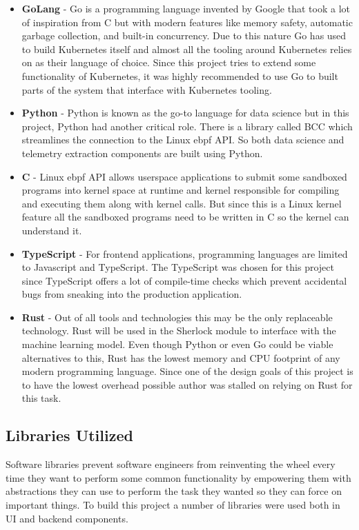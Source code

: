\begin{itemize}
    \item \textbf{GoLang} - Go is a programming language invented by Google that took a lot of inspiration from C but with modern features like memory safety, automatic garbage collection, and built-in concurrency. Due to this nature Go has used to build Kubernetes itself and almost all the tooling around Kubernetes relies on as their language of choice. Since this project tries to extend some functionality of Kubernetes, it was highly recommended to use Go to built parts of the system that interface with Kubernetes tooling.
    \item \textbf{Python} - Python is known as the go-to language for data science but in this project, Python had another critical role. There is a library called BCC which streamlines the connection to the Linux \ac{ebpf} API. So both data science and telemetry extraction components are built using Python.
    \item \textbf{C} - Linux \ac{ebpf} API allows userspace applications to submit some sandboxed programs into kernel space at runtime and kernel responsible for compiling and executing them along with kernel calls. But since this is a Linux kernel feature all the sandboxed programs need to be written in C so the kernel can understand it.
    \item \textbf{TypeScript} - For frontend applications, programming languages are limited to Javascript and TypeScript. The TypeScript was chosen for this project since TypeScript offers a lot of compile-time checks which prevent accidental bugs from sneaking into the production application.
    \item \textbf{Rust} - Out of all tools and technologies this may be the only replaceable technology. Rust will be used in the Sherlock module to interface with the machine learning model. Even though Python or even Go could be viable alternatives to this, Rust has the lowest memory and CPU footprint of any modern programming language. Since one of the design goals of this project is to have the lowest overhead possible author was stalled on relying on Rust for this task.
\end{itemize}



\subsection{Libraries Utilized}
Software libraries prevent software engineers from reinventing the wheel every time they want to perform some common functionality by empowering them with abstractions they can use to perform the task they wanted so they can force on important things. To build this project a number of libraries were used both in UI and backend components.


